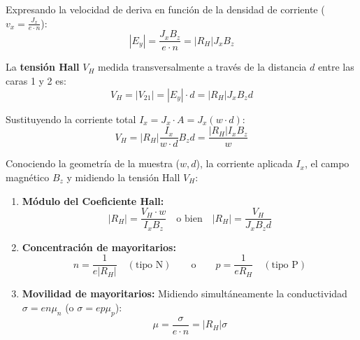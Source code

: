 Expresando la velocidad de deriva en función de la densidad de corriente ($v_x = \frac{J_x}{e \cdot n}$):
\[
|E_y| = \frac{J_x B_z}{e \cdot n} = |R_H| J_x B_z
\]

La \textbf{tensión Hall} $V_H$ medida transversalmente a través de la distancia $d$ entre las caras 1 y 2 es:
\[
V_H = |V_{21}| = |E_y| \cdot d = |R_H| J_x B_z d
\]

Sustituyendo la corriente total $I_x = J_x \cdot A = J_x (w \cdot d)$:
\[
V_H = |R_H| \frac{I_x}{w \cdot d} B_z d = \frac{|R_H| I_x B_z}{w}
\]

\begin{concepto}
Conociendo la geometría de la muestra ($w, d$), la corriente aplicada $I_x$, el campo magnético $B_z$ y midiendo la tensión Hall $V_H$:
\begin{enumerate}
    \item \textbf{Módulo del Coeficiente Hall:}
    \[
    |R_H| = \frac{V_H \cdot w}{I_x B_z} \quad \text{o bien} \quad |R_H| = \frac{V_H}{J_x B_z d}
    \]
    \item \textbf{Concentración de mayoritarios:}
    \[
    n = \frac{1}{e |R_H|} \quad (\text{tipo N}) \qquad \text{o} \qquad p = \frac{1}{e R_H} \quad (\text{tipo P})
    \]
    \item \textbf{Movilidad de mayoritarios:}
    Midiendo simultáneamente la conductividad $\sigma = e n \mu_n$ (o $\sigma = e p \mu_p$):
    \[
    \mu = \frac{\sigma}{e \cdot n} = |R_H| \sigma
    \]
\end{enumerate}
\end{concepto}


